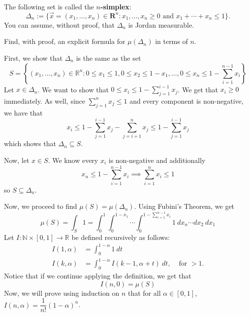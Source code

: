 \documentclass{article}
\newcommand{\R}{\mathbf{R}}
\theoremstyle{plain} %
\numberwithin{thm}{section} %
\theoremstyle{definition}
\begin{document}
    \newpage
    \begin{question}{37}
        The following set is called the \textbf{$n$-simplex}:
        \[ \Delta_n := \{ \vec{x}=(x_1,\ldots,x_n)\in \R^n : x_1,\ldots,x_n\geq 0 \text{ and } x_1+\cdots+x_n\leq 1\}. \]
        You can assume, without proof, that $\Delta_n$ is Jordan measurable.
        
        Find, with proof, an explicit formula for $\mu(\Delta_n)$ in terms of $n$.

        \tcblower

        First, we show that \(\Delta _n\) is the same as the set
        \[
            S = \left\{ (x_1, ..., x_n) \in \mathbb{R}^n : 0\leq x_1 \leq 1, 0 \leq x_2 \leq 1 - x_1, ..., 0 \leq x_n \leq 1 - \sum_{i=1}^{n-1} x_i \right\}
        \]
        Let \(x \in \Delta _n\). We want to show that \(0 \leq x_i \leq 1 - \sum_{j=1}^{i - 1} x_j\). We get that \(x_i \geq 0\) immediately. As well, since \(\sum_{j=1}^{n} x_j \leq 1\) and every component is non-negative, we have that
        \[
            x_i \leq 1 - \sum_{j=1}^{i - 1} x_j - \sum_{j=i+1}^{n} x_j \leq 1 - \sum_{j=1}^{i - 1} x_j
        \]
        which shows that \(\Delta _n \subseteq S\).

        Now, let \(x \in S\). We know every \(x_i\) is non-negative and additionally
        \[
            x_n \leq 1 - \sum_{i=1}^{n-1} x_i \implies \sum_{i=1}^{n} x_i \leq 1
        \]
        so \(S \subseteq \Delta _n\).

        Now, we proceed to find \(\mu (S) = \mu (\Delta _n)\). Using Fubini's Theorem, we get
        \[
            \mu (S) = \int _S 1 = \int _0^1 \int _0^{1-x_1} \cdots \int _0^{1 - \sum_{i=1}^{n-1} x_i} 1\ dx_n \cdots dx_2\ dx_1
        \]
        Let \(I: \mathbb{N} \times [0,1] \to \mathbb{R}\) be defined recursively as follows:
        \begin{align*}
            I(1, \alpha) &= \int _0^{1-\alpha} 1\ dt &\ \\
            I(k, \alpha) &= \int _0^{1-\alpha} I(k-1, \alpha + t)\ dt, &\text{ for } > 1.
        \end{align*}
        Notice that if we continue applying the definition, we get that
        \[
            I(n, 0) = \mu (S)
        \]
        Now, we will prove using induction on \(n\) that for all \(\alpha \in [0,1]\), \(I(n, \alpha) = \dfrac{1}{n!}(1 - \alpha)^n\).


\end{question}
\end{document}
